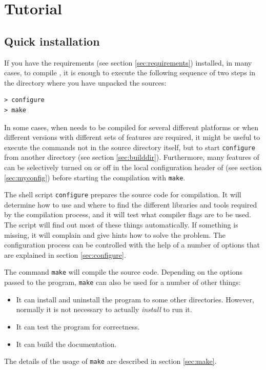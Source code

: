 \chapter{Tutorial}
\label{chap:tutorial}

\section{Quick installation}


If you have the requirements (see section \vref{sec:requirements})
installed, in many cases, to compile \es{}, it is enough to execute
the following sequence of two steps in the directory where you have
unpacked the sources:
\begin{verbatim}
> configure
> make
\end{verbatim}

In some cases, \eg{} when \es{} needs to be compiled for several
different platforms or when different versions with different sets of
features are required, it might be useful to execute the commands not
in the source directory itself, but to start \texttt{configure} from
another directory (see section \vref{sec:builddir}). Furthermore, many
features of \es{} can be selectively turned on or off in the local
configuration header of \es{} (see section \vref{sec:myconfig}) before
starting the compilation with \texttt{make}.

The shell script \texttt{configure} prepares the source code for
compilation. It will determine how to use and where to find the
different libraries and tools required by the compilation process, and
it will test what compiler flags are to be used.  The script will find
out most of these things automatically.  If something is missing, it
will complain and give hints how to solve the problem.  The
configuration process can be controlled with the help of a number of
options that are explained in section \vref{sec:configure}.

The command \texttt{make} will compile the source code. Depending on
the options passed to the program, \texttt{make} can also be used for
a number of other things:
\begin{itemize}
\item It can install and uninstall the program to some other
  directories. However, normally it is not necessary to actually
  \textit{install} \es{} to run it.
\item It can test the \es{} program for correctness.
\item It can build the documentation.
\end{itemize}
The details of the usage of \texttt{make} are described in section
\vref{sec:make}.

